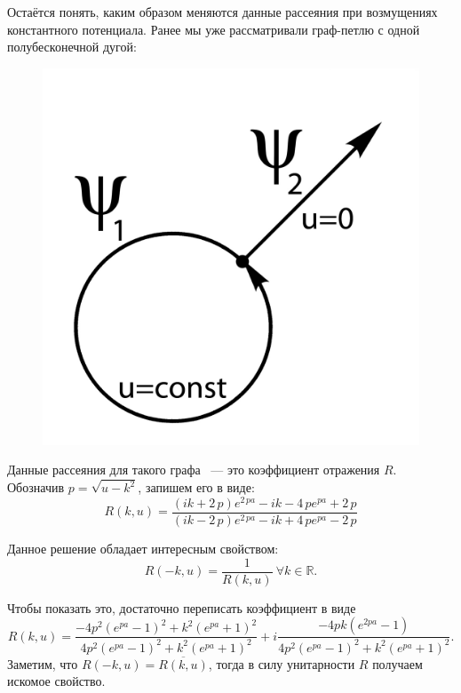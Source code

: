 \documentclass[a4 paper, 12 pt]{extarticle}
\begin{document}
   Остаётся понять, каким образом меняются данные рассеяния при возмущениях константного потенциала.
   Ранее мы уже рассматривали граф-петлю с одной полубесконечной дугой:
   \begin{figure}[!htb]
   	\centering
   	\includegraphics[scale=0.5]{one-arrow.jpg}
   \end{figure}


   Данные рассеяния для такого графа ~--- это коэффициент отражения $R$. Обозначив $p=\sqrt{u-k^2}$, запишем его в виде:
   \begin{equation}
   \label{OneDimensionalReflection}
   R\left(k,u\right) = {\frac { \left( ik+2\,p \right) {e}^{2\,pa}-ik-4\,p{e}^{pa}+2\,p}{ \left( ik-2\,p \right) {e}^{2\,pa}-ik+4\,p{e}^{pa}-2\,p}}
   \end{equation}
   
   Данное решение обладает интересным свойством: \[R\left(-k,u\right) = \frac{1}{R\left(k,u\right)} \ \forall k \in \mathbb{R}.\]
   
   Чтобы показать это, достаточно переписать коэффициент в виде
   \[ R\left(k,u\right) =
   \frac{-4p^2 \left(e^{pa}-1\right)^2 + k^2 \left(e^{pa}+1\right)^2}{4p^2 \left(e^{pa}-1\right)^2 + k^2 \left(e^{pa}+1\right)^2} + i \frac{-4pk\left(e^{2pa}-1\right)}{4p^2 \left(e^{pa}-1\right)^2 + k^2 \left(e^{pa}+1\right)^2}.\]
   Заметим, что $R\left(-k,u\right) = \overline{R\left(k,u\right)}$, тогда в силу унитарности $R$ получаем искомое свойство.  
   
\end{document}
